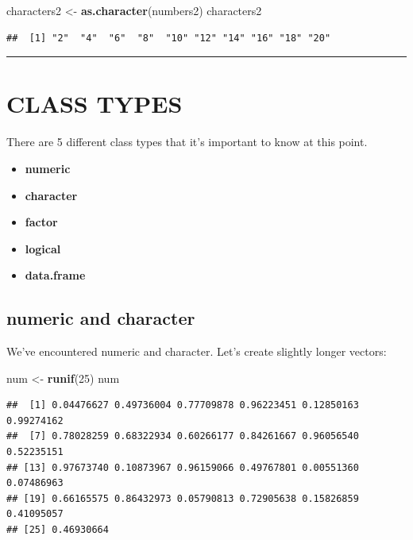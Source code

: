 \documentclass[
]{book}
\newenvironment{Shaded}{\begin{snugshade}}{\end{snugshade}}
\newcommand{\DecValTok}[1]{\textcolor[rgb]{0.00,0.00,0.81}{#1}}
\newcommand{\KeywordTok}[1]{\textcolor[rgb]{0.13,0.29,0.53}{\textbf{#1}}}
\newcommand{\NormalTok}[1]{#1}
\newcommand{\StringTok}[1]{\textcolor[rgb]{0.31,0.60,0.02}{#1}}
\providecommand{\tightlist}{%
  \setlength{\itemsep}{0pt}\setlength{\parskip}{0pt}}
\begin{document}
\begin{Shaded}
\begin{Highlighting}[]
\NormalTok{characters2 <-}\StringTok{ }\KeywordTok{as.character}\NormalTok{(numbers2)}
\NormalTok{characters2}
\end{Highlighting}
\end{Shaded}

\begin{verbatim}
##  [1] "2"  "4"  "6"  "8"  "10" "12" "14" "16" "18" "20"
\end{verbatim}

\begin{center}\rule{0.5\linewidth}{0.5pt}\end{center}

\hypertarget{class-types}{%
\section{CLASS TYPES}\label{class-types}}

There are 5 different class types that it's important to know at this point.

\begin{itemize}
\tightlist
\item
  \textbf{numeric}
\item
  \textbf{character}
\item
  \textbf{factor}
\item
  \textbf{logical}
\item
  \textbf{data.frame}
\end{itemize}

\hypertarget{numeric-and-character}{%
\subsection{numeric and character}\label{numeric-and-character}}

We've encountered numeric and character. Let's create slightly longer vectors:

\begin{Shaded}
\begin{Highlighting}[]
\NormalTok{num <-}\StringTok{ }\KeywordTok{runif}\NormalTok{(}\DecValTok{25}\NormalTok{)}
\NormalTok{num}
\end{Highlighting}
\end{Shaded}

\begin{verbatim}
##  [1] 0.04476627 0.49736004 0.77709878 0.96223451 0.12850163 0.99274162
##  [7] 0.78028259 0.68322934 0.60266177 0.84261667 0.96056540 0.52235151
## [13] 0.97673740 0.10873967 0.96159066 0.49767801 0.00551360 0.07486963
## [19] 0.66165575 0.86432973 0.05790813 0.72905638 0.15826859 0.41095057
## [25] 0.46930664
\end{verbatim}
\end{document}

